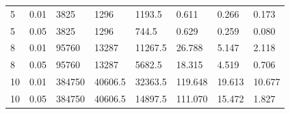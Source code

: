 \begin{tabular}{llllllll}
5 & 0.01 & 3825 & 1296 & 1193.5 & 0.611 & 0.266 & 0.173 \\
5 & 0.05 & 3825 & 1296 & 744.5 & 0.629 & 0.259 & 0.080 \\
8 & 0.01 & 95760 & 13287 & 11267.5 & 26.788 & 5.147 & 2.118 \\
8 & 0.05 & 95760 & 13287 & 5682.5 & 18.315 & 4.519 & 0.706 \\
10 & 0.01 & 384750 & 40606.5 & 32363.5 & 119.648 & 19.613 & 10.677 \\
10 & 0.05 & 384750 & 40606.5 & 14897.5 & 111.070 & 15.472 & 1.827 \\
\end{tabular}
